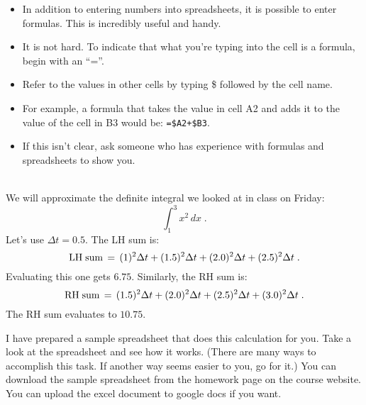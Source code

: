 \documentclass[12pt]{article}
\begin{document}
\begin{itemize}
  \item In addition to entering numbers into spreadsheets, it is
    possible to enter formulas.  This is incredibly useful and handy.
  \item It is not hard.  To indicate that what you're typing into the
    cell is a formula, begin with an ``=''.
  \item Refer to the values in other cells by typing \$ followed by
    the cell name.
  \item For example, a formula that takes the value in cell A2 and
    adds it to the value of the cell in B3 would be: {\tt =\$A2+\$B3}.
  \item If this isn't clear, ask someone who has experience with
    formulas and spreadsheets to show you.
\end{itemize}

\\

\noindent We will approximate the definite integral we looked at in
class on Friday: 
\begin{equation}
  \int_1^3 x^2 \, dx \; .
\end{equation}
Let's use $\Delta t = 0.5$.  The LH sum is:
\begin{equation}
  {\rm LH\;sum} \, = \, (1)^2\Delta t + (1.5)^2\Delta t + 
    (2.0)^2\Delta t + (2.5)^2\Delta t \;.
\end{equation}
Evaluating this one gets $6.75$.  Similarly, the RH sum is:
\begin{equation}
  {\rm RH\;sum} \, = \, (1.5)^2\Delta t + (2.0)^2\Delta t + 
    (2.5)^2\Delta t + (3.0)^2\Delta t \;.
\end{equation}
The RH sum evaluates to $10.75$.

I have prepared a sample spreadsheet that does this calculation for
you.  Take a look at the spreadsheet and see how it works.  (There are
many ways to accomplish this task.  If another way seems easier to
you, go for it.)  You can download the 
sample spreadsheet from the homework page on the course website.  You
can upload the excel document to google docs if you want.\\

\end{document}
